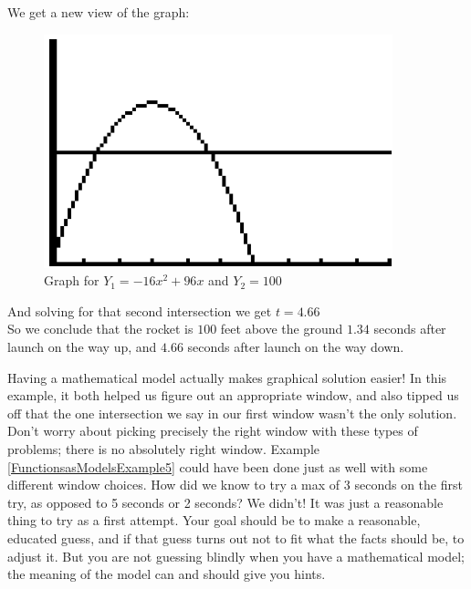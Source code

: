 {	We get a new view of the graph:
	
	\begin{figure}[H]
		\centering
		\includegraphics[scale=0.8]{Sections/FunctionsasModelsImages/Figure04.png}
		\caption{Graph for $Y_1=-16x^2+96x$ and $Y_2=100$}
	\end{figure}
	
	And solving for that second intersection we get $t=4.66$\\
	
	So we conclude that the rocket is $100$ feet above the ground $1.34$ seconds after launch on the way up, and $4.66$ seconds after launch on the way down.
}

\bigskip

Having a mathematical model actually makes graphical solution easier! In this example, it both helped us figure out an appropriate window, and also tipped us off that the one intersection we say in our first window wasn’t the only solution.\\

Don’t worry about picking precisely the right window with these types of problems; there is no absolutely right window. Example \ref{FunctionsasModelsExample5} could have been done just as well with some different window choices. How did we know to try a max of 3 seconds on the first try, as opposed to 5 seconds or 2 seconds? We didn’t! It was just a reasonable thing to try as a first attempt. Your goal should be to make a reasonable, educated guess, and if that guess turns out not to fit what the facts should be, to adjust it. But you are not guessing blindly when you have a mathematical model; the meaning of the model can and should give you hints.

%
%

